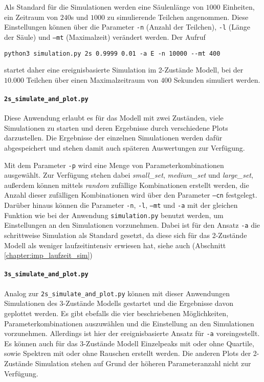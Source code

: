 Als Standard für die Simulationen werden eine Säulenlänge von $1000$ Einheiten, ein Zeitraum von $240$s und $1000$ zu simulierende Teilchen angenommen. Diese Einstellungen können über die Parameter \texttt{-n} (Anzahl der Teilchen), \texttt{-l} (Länge der Säule) und \texttt{--mt} (Maximalzeit) verändert werden.
Der Aufruf
\begin{verbatim}
python3 simulation.py 2s 0.9999 0.01 -a E -n 10000 --mt 400
\end{verbatim}
startet daher eine ereignisbasierte Simulation im 2-Zustände Modell, bei der $10.000$ Teilchen über einen Maximalzeitraum von $400$ Sekunden simuliert werden.


\paragraph{\texttt{2s\_simulate\_and\_plot.py}}
Diese Anwendung erlaubt es für das Modell mit zwei Zuständen, viele Simulationen zu starten und deren Ergebnisse durch verschiedene Plots darzustellen. Die Ergebnisse der einzelnen Simulationen werden dafür abgespeichert und stehen damit auch späteren Auswertungen zur Verfügung.

Mit dem Parameter \texttt{-p} wird eine Menge von Parameterkombinationen ausgewählt. Zur Verfügung stehen dabei \textit{small\_set}, \textit{medium\_set} und \textit{large\_set}, außerdem können mittels \textit{random} zufällige Kombinationen erstellt werden, die Anzahl dieser zufälligen Kombinationen wird über den Parameter \texttt{--cn} festgelegt. %
Darüber hinaus können die Parameter \texttt{-n}, \texttt{-l}, \texttt{--mt} und \texttt{-a} mit der gleichen Funktion wie bei der Anwendung \texttt{simulation.py} benutzt werden, um Einstellungen an den Simulationen vorzunehmen. Dabei ist für den Ansatz \texttt{-a} die schrittweise Simulation als Standard gesetzt, da diese sich für das 2-Zustände Modell als weniger laufzeitintensiv erwiesen hat, siehe auch (Abschnitt \ref{chapter:imp_laufzeit_sim})


\paragraph{\texttt{3s\_simulate\_and\_plot.py}}
Analog zur \texttt{2s\_simulate\_and\_plot.py} können mit dieser Anwendungen Simulationen des 3-Zustände Modells gestartet und die Ergebnisse davon geplottet werden. Es gibt ebefalls die vier beschriebenen Möglichkeiten, Parameterkombinationen auszuwählen und die Einstellung an den Simulationen vorzunehmen. Allerdings ist hier der ereignisbasierte Ansatz für \texttt{-a} voreingestellt.
Es können auch für das 3-Zustände Modell Einzelpeaks mit oder ohne Quartile, sowie Spektren mit oder ohne Rauschen erstellt werden. Die anderen Plots der 2-Zustände Simulation stehen auf Grund der höheren Parameteranzahl nicht zur Verfügung.

